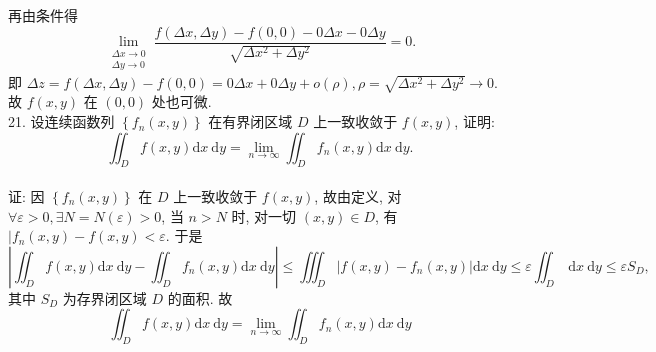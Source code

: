 \documentclass[a4paper,11pt,UTF8]{article}
\begin{document}
再由条件得
$$
\lim _{\substack{\Delta x \rightarrow 0 \\ \Delta y \rightarrow 0}} \frac{f(\Delta x, \Delta y)-f(0,0)-0 \Delta x-0 \Delta y}{\sqrt{\Delta x^2+\Delta y^2}}=0 .
$$
即 $\Delta z=f(\Delta x, \Delta y)-f(0,0)=0 \Delta x+0 \Delta y+o(\rho), \rho=\sqrt{\Delta x^2+\Delta y^2} \rightarrow 0$.
故 $f(x, y)$ 在 $(0,0)$ 处也可微.
\\
21. 设连续函数列 $\left\{f_n(x, y)\right\}$ 在有界闭区域 $D$ 上一致收敛于 $f(x, y)$, 证明:
$$
\iint_D f(x, y) \mathrm{d} x \mathrm{~d} y=\lim _{n \rightarrow \infty} \iint_D f_n(x, y) \mathrm{d} x \mathrm{~d} y .
$$\\
证: 因 $\left\{f_n(x, y)\right\}$ 在 $D$ 上一致收敛于 $f(x, y)$, 故由定义, 对 $\forall \varepsilon>0, \exists N=N(\varepsilon)>0$, 当 $n>N$ 时, 对一切 $(x, y) \in D$, 有 $\mid f_n(x, y)-f(x, y)<\varepsilon$.
于是
$$
\left|\iint_D f(x, y) \mathrm{d} x \mathrm{~d} y-\iint_D f_n(x, y) \mathrm{d} x \mathrm{~d} y\right| \leq \iiint_D\left|f(x, y)-f_n(x, y)\right| \mathrm{d} x \mathrm{~d} y \leq \varepsilon \iint_D \mathrm{~d} x \mathrm{~d} y \leq \varepsilon S_D,
$$
其中 $S_D$ 为存界闭区域 $D$ 的面积. 故
$$
\iint_D f(x, y) \mathrm{d} x \mathrm{~d} y=\lim _{n \rightarrow \infty} \iint_D f_n(x, y) \mathrm{d} x \mathrm{~d} y
$$\\
\end{document}
